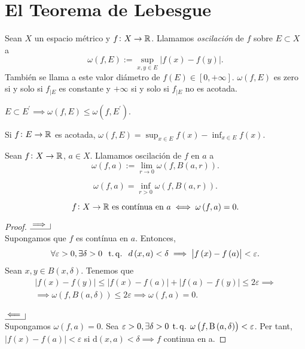 \section{El Teorema de Lebesgue}
\begin{defi}
    Sean $X$ un espacio métrico y $f\colon X \to \mathbb{R}$. Llamamos
    \textit{oscilación} de $f$ sobre $E \subset X$ a
    \[
        \omega\left( f, E \right) := \sup_{x, y \in E} \left| f\left( x\right) -
        f\left( y\right)\right|.
    \]
    También se llama a este valor diámetro de $f\left( E\right) \in \left[
    0, +\infty \right]$. $\omega\left( f, E \right)$ es zero si y solo si $f_{|E}$ es
    constante y $+\infty$ si y solo si $f_{|E}$ no es acotada.
\end{defi}
\begin{obs}
    $E \subset E^{\prime} \implies \omega\left( f, E\right) \leq \omega\left( f, E^{
    \prime}\right)$.
\end{obs}
\begin{lema}
    Si $f\colon E \to \mathbb{R}$ es acotada, $\omega \left( f, E \right)= \sup_{x\in E}
    f\left( x\right) - \inf_{x\in E} f\left( x\right)$.
\end{lema}
\begin{defi}
    Sean $f\colon X \to \mathbb{R}$, $a\in X$. Llamamos oscilación de $f$ en $a$ a
    \[
        \omega\left( f, a\right) := \lim_{r\to 0} \omega\left( f, B\left( a, r
        \right) \right).
    \]
\end{defi}
\begin{obs*}
    \[
        \omega\left( f, a\right) = \inf_{r>0} \omega\left( f, B\left(
        a, r\right) \right).
    \]
\end{obs*}
\begin{lema}
    \[
        f\colon X \to \mathbb{R} \text{  es contínua en $a$} \iff \omega\left( f, a\right)
        = 0.
    \]
\end{lema}
\begin{proof}
    $\bimplies$ \\
    Supongamos que $f$ es contínua en $a$. Entonces,
    \[
        \forall \varepsilon > 0, \exists \delta > 0 \; \operatorname{\;t.q.\;} \; d\left(x, a \right)
        <\delta \implies \left| f\left(x \right) - f\left( a \right) \right|
        < \varepsilon.
    \]
    Sean $x, y \in B\left( x, \delta \right)$. Tenemos que
    \[
        \begin{gathered}
            \left| f\left(x \right) - f\left( y \right) \right| \leq
            \left| f\left(x \right) - f\left( a \right) \right| +
            \left| f\left(a \right) - f\left( y \right) \right| \leq 2\varepsilon
            \implies \\
            \implies \omega\left( f, B\left( a, \delta \right) \right) \leq
            2\varepsilon \implies \omega \left( f, a \right) =0.
        \end{gathered}
    \] \\
    $\bimpliedby$ \\
    Supongamos $\omega \left( f, a \right) = 0$. Sea $\varepsilon > 0, \exists \delta > 0 \operatorname{\;t.q.\;} \omega \left( f, \text{B}\left(a, \delta \right) \right) < \varepsilon$. Per tant, $|f(x) - f(a)| < \varepsilon$ si $\text{d}\left( x, a \right) < \delta \implies f$ continua en a.
\end{proof}
